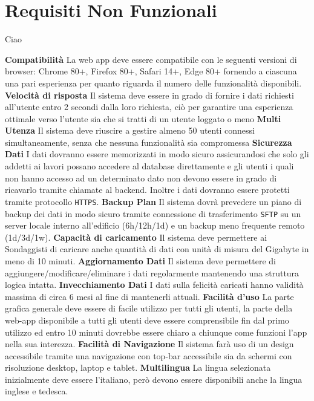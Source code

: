 \chapter{Requisiti Non Funzionali} 
\thispagestyle{stdPage}
    Ciao
    \begin{rnfList}
        \rnfItem \textbf{Compatibilità} La web app deve essere compatibile con le seguenti versioni di browser: Chrome 80+, Firefox 80+, Safari 14+, Edge 80+ fornendo a ciascuna una pari esperienza per quanto riguarda il numero delle funzionalità disponibili.
        \rnfItem \textbf{Velocità di risposta} Il sistema deve essere in grado di fornire i dati richiesti all’utente entro 2 secondi dalla loro richiesta, ciò per garantire una esperienza ottimale verso l’utente sia che si tratti di un utente loggato o meno
        \rnfItem \textbf{Multi Utenza} Il sistema deve riuscire a gestire almeno 50 utenti connessi simultaneamente, senza che nessuna funzionalità sia compromessa
        \rnfItem \textbf{Sicurezza Dati} I dati dovranno essere memorizzati in modo sicuro assicurandosi che solo gli addetti ai lavori possano accedere al database direttamente e gli utenti i quali non hanno accesso ad un determinato dato non devono essere in grado di ricavarlo tramite chiamate al backend. Inoltre i dati dovranno essere protetti tramite protocollo \texttt{HTTPS}.
        \rnfItem \textbf{Backup Plan} Il sistema dovrà prevedere un piano di backup dei dati in modo sicuro tramite connessione di trasferimento \texttt{SFTP} su un server locale interno all'edificio (6h/12h/1d) e un backup meno frequente remoto (1d/3d/1w).
        \rnfItem \textbf{Capacità di caricamento} Il sistema deve permettere ai Sondaggisti di caricare anche quantità di dati con unità di misura del Gigabyte in meno di 10 minuti.
        \rnfItem \textbf{Aggiornamento Dati} Il sistema deve permettere di aggiungere/modificare/eliminare i dati regolarmente mantenendo una struttura logica intatta.
        \rnfItem \textbf{Invecchiamento Dati} I dati sulla felicità caricati hanno validità massima di circa 6 mesi al fine di mantenerli attuali.
        \rnfItem \textbf{Facilità d'uso} La parte grafica generale deve essere di facile utilizzo per tutti gli utenti, la parte della web-app disponibile a tutti gli utenti deve essere comprensibile fin dal primo utilizzo ed entro 10 minuti dovrebbe essere chiaro a chiunque come funzioni l'app nella sua interezza.
        \rnfItem \textbf{Facilità di Navigazione} Il sistema farà uso di un design accessibile tramite una navigazione con top-bar accessibile sia da schermi con risoluzione desktop, laptop e tablet.
        \rnfItem \textbf{Multilingua} La lingua selezionata inizialmente deve essere l'italiano, però devono essere disponibili anche la lingua inglese e tedesca.
    \end{rnfList}